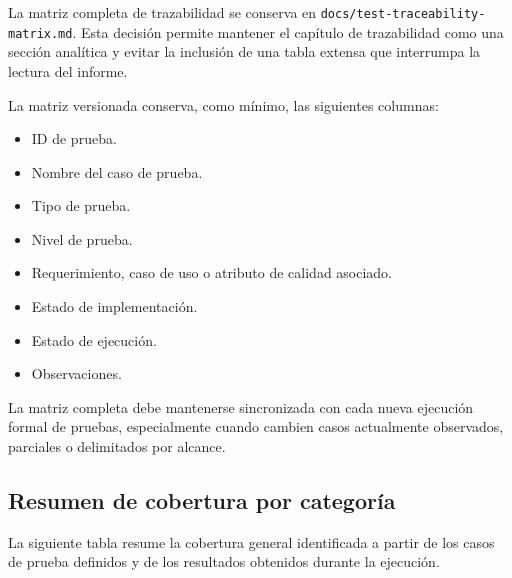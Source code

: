 \documentclass[12pt,letterpaper]{article}
\begin{document}
La matriz completa de trazabilidad se conserva en \texttt{docs/test-traceability-matrix.md}. Esta decisión permite mantener el capítulo de trazabilidad como una sección analítica y evitar la inclusión de una tabla extensa que interrumpa la lectura del informe.

La matriz versionada conserva, como mínimo, las siguientes columnas:

\begin{itemize}
    \item ID de prueba.
    \item Nombre del caso de prueba.
    \item Tipo de prueba.
    \item Nivel de prueba.
    \item Requerimiento, caso de uso o atributo de calidad asociado.
    \item Estado de implementación.
    \item Estado de ejecución.
    \item Observaciones.
\end{itemize}

La matriz completa debe mantenerse sincronizada con cada nueva ejecución formal de pruebas, especialmente cuando cambien casos actualmente observados, parciales o delimitados por alcance.

\subsection{Resumen de cobertura por categoría}

La siguiente tabla resume la cobertura general identificada a partir de los casos de prueba definidos y de los resultados obtenidos durante la ejecución.
\end{document}
